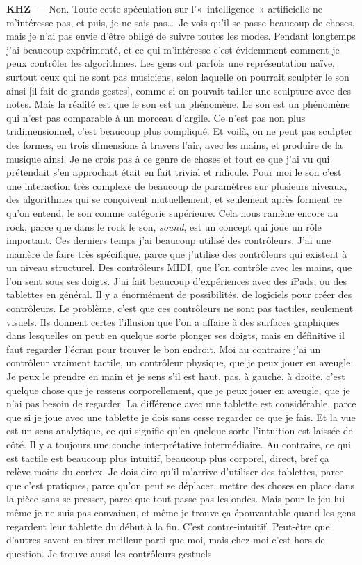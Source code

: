 \documentclass[a4paper,12pt]{article}
\newcommand{\guill}[1]{«~#1~»}
\begin{document}
\textbf{KHZ ---} Non. Toute cette spéculation sur l'\guill{intelligence} artificielle ne m'intéresse pas, et puis, je ne sais pas\dots~Je vois qu'il se passe beaucoup de choses, mais je n'ai pas envie d'être obligé de suivre toutes les modes. Pendant longtemps j'ai beaucoup expérimenté, et ce qui m'intéresse c'est évidemment comment je peux contrôler les algorithmes. Les gens ont parfois une représentation naïve, surtout ceux qui ne sont pas musiciens, selon laquelle on pourrait sculpter le son ainsi [il fait de grands gestes], comme si on pouvait tailler une sculpture avec des notes. Mais la réalité est que le son est un phénomène. Le son est un phénomène qui n'est pas comparable à un morceau d'argile. Ce n'est pas non plus tridimensionnel, c'est beaucoup plus compliqué. Et voilà, on ne peut pas sculpter des formes, en trois dimensions à travers l'air, avec les mains, et produire de la musique ainsi. Je ne crois pas à ce genre de choses et tout ce que j'ai vu qui prétendait s'en approchait était en fait trivial et ridicule. Pour moi le son c'est une interaction très complexe de beaucoup de paramètres sur plusieurs niveaux, des algorithmes qui se conçoivent mutuellement, et seulement après forment ce qu'on entend, le son comme catégorie supérieure. Cela nous ramène encore au rock, parce que dans le rock le son, \emph{sound}, est un concept qui joue un rôle important. Ces derniers temps j'ai beaucoup utilisé des contrôleurs. J'ai une manière de faire très spécifique, parce que j'utilise des contrôleurs qui existent à un niveau structurel. Des contrôleurs MIDI, que l'on contrôle avec les mains, que l'on sent sous ses doigts. J'ai fait beaucoup d'expériences avec des iPads, ou des tablettes en général. Il y a énormément de possibilités, de logiciels pour créer des contrôleurs. Le problème, c'est que ces contrôleurs ne sont pas tactiles, seulement visuels. Ils donnent certes l'illusion que l'on a affaire à des surfaces graphiques dans lesquelles on peut en quelque sorte plonger ses doigts, mais en définitive il faut regarder l'écran pour trouver le bon endroit. Moi au contraire j'ai un contrôleur vraiment tactile, un contrôleur physique, que je peux jouer en aveugle. Je peux le prendre en main et je sens s'il est haut, pas, à gauche, à droite, c'est quelque chose que je ressens corporellement, que je peux jouer en aveugle, que je n'ai pas besoin de regarder. La différence avec une tablette est considérable, parce que si je joue avec une tablette je dois sans cesse regarder ce que je fais. Et la vue est un sens analytique, ce qui signifie qu'en quelque sorte l'intuition est laissée de côté. Il y a toujours une couche interprétative intermédiaire. Au contraire, ce qui est tactile est beaucoup plus intuitif, beaucoup plus corporel, direct, bref ça relève moins du cortex. Je dois dire qu'il m'arrive d'utiliser des tablettes, parce que c'est pratiques, parce qu'on peut se déplacer, mettre des choses en place dans la pièce sans se presser, parce que tout passe pas les ondes. Mais pour le jeu lui-même je ne suis pas convaincu, et même je trouve ça épouvantable quand les gens regardent leur tablette du début à la fin. C'est contre-intuitif. Peut-être que d'autres savent en tirer meilleur parti que moi, mais chez moi c'est hors de question. Je trouve aussi les contrôleurs gestuels 
\end{document}

